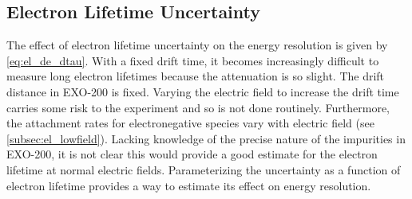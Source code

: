 \documentclass[herrin-thesis.tex]{subfiles}
\begin{document}
\subsection{Electron Lifetime Uncertainty}
\label{subsec:el_dtau}
The effect of electron lifetime uncertainty on the energy resolution is given by \cref{eq:el_de_dtau}. With a fixed drift time, it becomes increasingly difficult to measure long electron lifetimes because the attenuation is so slight. The drift distance in EXO-200 is fixed. Varying the electric field to increase the drift time carries some risk to the experiment and so is not done routinely. Furthermore, the attachment rates for electronegative species vary with electric field (see \cref{subsec:el_lowfield}). Lacking knowledge of the precise nature of the impurities in EXO-200, it is not clear this would provide a good estimate for the electron lifetime at normal electric fields. Parameterizing the uncertainty as a function of electron lifetime provides a way to estimate its effect on energy resolution.
\end{document}
